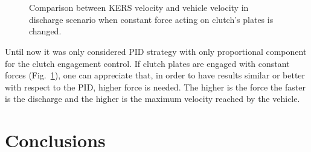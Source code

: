 \documentclass[11pt]{article}
\begin{document}
\begin{figure}[H]
	\centering
	 \\
	 \\
	\caption{Comparison between KERS velocity \protect{} and vehicle velocity  \protect{} in discharge scenario when constant force acting on clutch's plates is changed.}
	\label{fig: kforcediscomp}
\end{figure}

Until now it was only considered PID strategy with only proportional component for the clutch engagement control. If clutch plates are engaged with constant forces (Fig.~\ref{fig: kforcediscomp}), one can appreciate that, in order to have results similar or better with respect to the PID, higher force is needed. The higher is the force the faster is the discharge and the higher is the maximum velocity reached by the vehicle. 

\newpage

\section{Conclusions}
\end{document}
